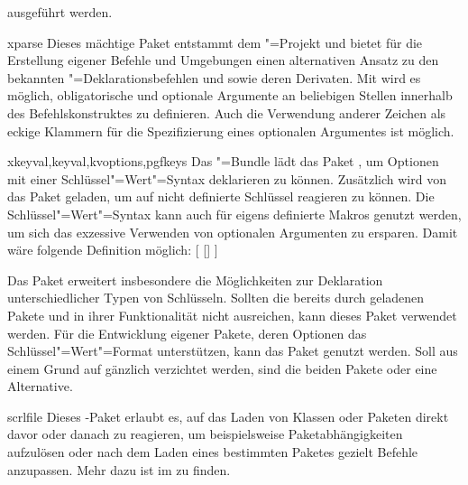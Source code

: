 \begin{packages}
  ausgeführt werden.
\item[xparse]
  Dieses mächtige Paket entstammt dem "=Projekt und bietet für 
  die Erstellung eigener Befehle und Umgebungen einen alternativen Ansatz zu 
  den bekannten "=Deklarationsbefehlen  und 
   sowie deren Derivaten. Mit  wird es 
  möglich, obligatorische und optionale Argumente an beliebigen Stellen 
  innerhalb des Befehlskonstruktes zu definieren. Auch die Verwendung anderer 
  Zeichen als eckige Klammern für die Spezifizierung eines optionalen 
  Argumentes ist möglich.
\item[xkeyval,keyval,kvoptions,pgfkeys]
  Das \KOMAScript"=Bundle lädt das Paket , um Optionen mit 
  einer Schlüssel"=Wert"=Syntax deklarieren zu können. Zusätzlich wird von 
  \TUDScript das Paket  geladen, um auf nicht definierte 
  Schlüssel reagieren zu können. Die Schlüssel"=Wert"=Syntax kann auch für 
  eigens definierte Makros genutzt werden, um sich das exzessive Verwenden von 
  optionalen Argumenten zu ersparen. Damit wäre folgende Definition möglich:
  [%
    []%
  ]
  
  Das Paket  erweitert insbesondere die Möglichkeiten zur 
  Deklaration unterschiedlicher Typen von Schlüsseln. Sollten die bereits durch 
  \TUDScript geladenen Pakete  und  in ihrer 
  Funktionalität nicht ausreichen, kann dieses Paket verwendet werden. Für die 
  Entwicklung eigener Pakete, deren Optionen das Schlüssel"=Wert"=Format 
  unterstützen, kann das Paket  genutzt werden. Soll aus einem 
  Grund auf \KOMAScript{} gänzlich verzichtet werden, sind die beiden Pakete 
   oder  eine Alternative.
\item[scrlfile]
  Dieses \KOMAScript-Paket erlaubt es, auf das Laden von Klassen oder Paketen 
  direkt davor oder danach zu reagieren, um beispielsweise Paketabhängigkeiten 
  aufzulösen oder nach dem Laden eines bestimmten Paketes gezielt Befehle 
  anzupassen. Mehr dazu ist im \scrguide zu finden.
\end{packages}

